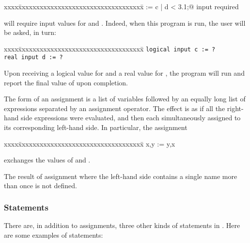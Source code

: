 \begin{tt}
\begin{tabbing}
xxxx\=xxxxxxxxxxxxxxxxxxxxxxxxxxxxxxxxxxx\=\kill
\>\verb@b := c | d < 3.1;@  \>\bq input required 
\end{tabbing} 
\end{tt}

\noindent
will require input values for  and .  
Indeed, when this program is run, the user will be asked, in turn:

\begin{tt}
\begin{tabbing}
xxxx\=xxxxxxxxxxxxxxxxxxxxxxxxxxxxxxxxxxx\=\kill
\>\tt logical input c := ? \\
\>\tt real input d := ?
\end{tabbing}
\end{tt}

\noindent
Upon receiving a logical value for  and a real value for , 
the program will run and report the final value of  upon 
completion.

The form of an assignment is a list of variables followed by an equally 
long list of expressions separated by an assignment operator.
The effect is as if all the right-hand side expressions were evaluated, 
and then each simultaneously assigned to its corresponding left-hand side.  
In particular, the assignment

\begin{tt}
\begin{tabbing}
xxxx\=xxxxxxxxxxxxxxxxxxxxxxxxxxxxxxxxxxx\=\kill
\>x,y := y,x
\end{tabbing}
\end{tt}

\noindent
exchanges the values of  and .  

The result of assignment where the left-hand side contains a single name 
more than once is not defined.

\subsubsection{Statements}

There are, in addition to assignments, three other kinds of statements 
in .  Here are some examples of statements:

\vspace{1ex}


